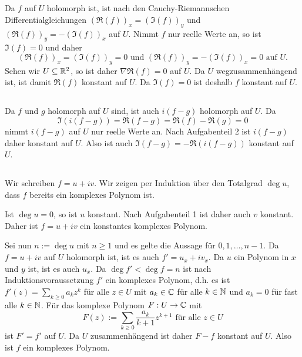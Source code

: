 \documentclass[a4paper,10pt]{article}
\begin{document}
\section{}


\addtocounter{subsection}{1}
\subsection{}
Da $f$ auf $U$ holomorph ist, ist nach den Cauchy-Riemannschen Differentialgleichungen $(\Re(f))_x = (\Im(f))_y$ und $(\Re(f))_y = -(\Im(f))_x$ auf $U$. Nimmt $f$ nur reelle Werte an, so ist $\Im(f) = 0$ und daher
\[
 (\Re(f))_x = (\Im(f))_y = 0 \text{ und } (\Re(f))_y = -(\Im(f))_x = 0 \text{ auf } U.
\]
Sehen wir $U \subseteq \mathbb{R}^2$, so ist daher $\nabla \Re(f) = 0$ auf $U$. Da $U$ wegzusammenhängend ist, ist damit $\Re(f)$ konstant auf $U$. Da $\Im(f) = 0$ ist deshalb $f$ konstant auf $U$.


\addtocounter{subsection}{-2}
\subsection{}
Da $f$ und $g$ holomorph auf $U$ sind, ist auch $i(f-g)$ holomorph auf $U$. Da
\[
 \Im(i(f-g)) = \Re(f-g) = \Re(f)-\Re(g) = 0
\]
nimmt $i(f-g)$ auf $U$ nur reelle Werte an. Nach Aufgabenteil 2 ist $i(f-g)$ daher konstant auf $U$. Also ist auch $\Im(f-g) = -\Re(i(f-g))$ konstant auf $U$.


\addtocounter{subsection}{1}
\subsection{}
Wir schreiben $f=u+iv$. Wir zeigen per Induktion über den Totalgrad $\deg u$, dass $f$ bereits ein komplexes Polynom ist.

Ist $\deg u = 0$, so ist $u$ konstant. Nach Aufgabenteil 1 ist daher auch $v$ konstant. Daher ist $f = u+iv$ ein konstantes komplexes Polynom.

Sei nun $n := \deg u$ mit $n \geq 1$ und es gelte die Aussage für $0,1,\ldots,n-1$. Da $f = u+iv$ auf $U$ holomorph ist, ist es auch $f' = u_x + i v_x$. Da $u$ ein Polynom in $x$ und $y$ ist, ist es auch $u_x$. Da $\deg f' < \deg f = n$ ist nach Induktionsvoraussetzung $f'$ ein komplexes Polynom, d.h. es ist $f'(z) = \sum_{k \geq 0} a_k z^k$ für alle $z \in U$ mit $a_k \in \mathbb{C}$ für alle $k \in \mathbb{N}$ und $a_k = 0$ für fast alle $k \in \mathbb{N}$. Für das komplexe Polynom $F : U \to \mathbb{C}$ mit
\[
 F(z) := \sum_{k \geq 0} \frac{a_k}{k+1} z^{k+1} \text{ für alle } z \in U
\]
ist $F' = f'$ auf $U$. Da $U$ zusammenhängend ist daher $F-f$ konstant auf $U$. Also ist $f$ ein komplexes Polynom.
\end{document}
